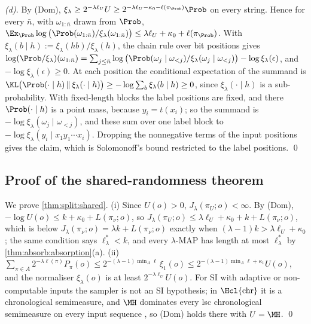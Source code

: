 \emph{(d).} By (Dom), $\xi_\lambda\ge2^{-\lambda\ell_U}U\ge2^{-\lambda\ell_U-\kappa_0-\ell(\pi_{\Prob})}\Prob$ on every string. Hence for every $\bar n$, with $\omega_{1:\bar n}$ drawn from $\Prob$, $\Ex_{\Prob}\log\big(\Prob(\omega_{1:\bar n})/\xi_\lambda(\omega_{1:\bar n})\big)\le\lambda\ell_U+\kappa_0+\ell(\pi_{\Prob})$. With $\xi_\lambda(b\mid h):=\xi_\lambda(hb)/\xi_\lambda(h)$, the chain rule over bit positions gives $\log(\Prob/\xi_\lambda)(\omega_{1:\bar n})=\sum_{j\le\bar n}\log\big(\Prob(\omega_j\mid\omega_{<j})/\xi_\lambda(\omega_j\mid\omega_{<j})\big)-\log\xi_\lambda(\epsilon)$, and $-\log\xi_\lambda(\epsilon)\ge0$. At each position the conditional expectation of the summand is $\KL\big(\Prob(\cdot\mid h)\,\|\,\xi_\lambda(\cdot\mid h)\big)\ge-\log\sum_b\xi_\lambda(b\mid h)\ge0$, since $\xi_\lambda(\cdot\mid h)$ is a sub-probability. With fixed-length blocks the label positions are fixed, and there $\Prob(\cdot\mid h)$ is a point mass, because $y_i=t(x_i)$; so the summand is $-\log\xi_\lambda(\omega_j\mid\omega_{<j})$, and these sum over one label block to $-\log\xi_\lambda(y_i\mid x_1y_1\cdots x_i)$. Dropping the nonnegative terms of the input positions gives the claim, which is Solomonoff's bound \citep{solomonoff1978complexity} restricted to the label positions. \qed

\subsection{Proof of the shared-randomness theorem}\label{app:split:shared}

We prove \cref{thm:split:shared}. (i) Since $U(o)>0$, $J_\lambda(\pi_U;o)<\infty$. By (Dom), $-\log U(o)\le k+\kappa_0+L(\pi_\nu;o)$, so $J_\lambda(\pi_U;o)\le\lambda\ell_U+\kappa_0+k+L(\pi_\nu;o)$, which is below $J_\lambda(\pi_\nu;o)=\lambda k+L(\pi_\nu;o)$ exactly when $(\lambda-1)k>\lambda\ell_U+\kappa_0$; the same condition says $\ell^*_\lambda<k$, and every $\lambda$-MAP has length at most $\ell^*_\lambda$ by \cref{thm:absorb:absorption}(a). (ii) $\sum_{\pi\in A}2^{-\lambda\ell(\pi)}P_\pi(o)\le2^{-(\lambda-1)\min_A\ell}\,\xi_1(o)\le2^{-(\lambda-1)\min_A\ell+\kappa_1}U(o)$, and the normaliser $\xi_\lambda(o)$ is at least $2^{-\lambda\ell_U}U(o)$. For SI with adaptive or non-computable inputs the sampler is not an SI hypothesis; in $\Hcl{\mathrm{chr}}$ it is a chronological semimeasure, and $\MH$ dominates every lsc chronological semimeasure on every input sequence \citep[Corollary~6.17(a)]{claudeSFI2026fundamentals}, so (Dom) holds there with $U=\MH$. \qed%


